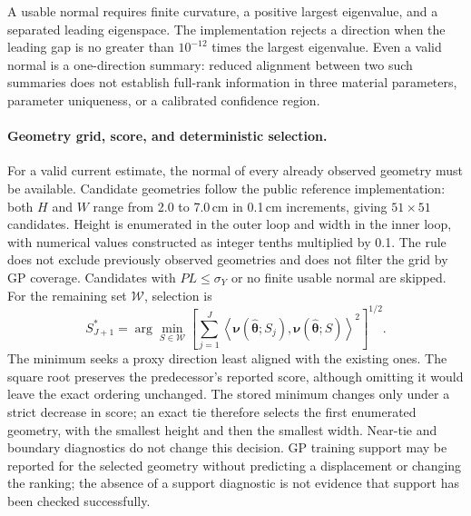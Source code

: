 A usable normal requires finite curvature, a positive largest
eigenvalue, and a separated leading eigenspace. The implementation
rejects a direction when the leading gap is no greater than
$10^{-12}$ times the largest eigenvalue. Even a valid normal is a
one-direction summary: reduced alignment between two such summaries
does not establish full-rank information in three material parameters,
parameter uniqueness, or a calibrated confidence region.

\paragraph{Geometry grid, score, and deterministic selection.}
For a valid current estimate, the normal of every already observed
geometry must be available. Candidate geometries follow the public
reference implementation: both $H$ and $W$ range from 2.0 to 7.0\,cm
in 0.1\,cm increments, giving $51\times51$ candidates. Height is
enumerated in the outer loop and width in the inner loop, with numerical
values constructed as integer tenths multiplied by 0.1. The rule does
not exclude previously observed geometries and does not filter the grid
by GP coverage. Candidates with $PL\leq\sigma_Y$ or no finite usable
normal are skipped. For the remaining set $\mathcal W$, selection is
\begin{equation}
\label{eq:proposer}
 S_{J+1}^*=\arg\min_{S\in\mathcal W}
 \left[\sum_{j=1}^{J}
   \left\langle
    \boldsymbol\nu(\widehat{\boldsymbol\theta};S_j),
    \boldsymbol\nu(\widehat{\boldsymbol\theta};S)
   \right\rangle^2\right]^{1/2}.
\end{equation}
The minimum seeks a proxy direction least aligned with the existing
ones. The square root preserves the predecessor's reported score,
although omitting it would leave the exact ordering unchanged.
The stored minimum changes only under a strict decrease in score;
an exact tie therefore selects the first enumerated geometry, with
the smallest height and then the smallest width. Near-tie and boundary
diagnostics do not change this decision. GP training support may be
reported for the selected geometry without predicting a displacement
or changing the ranking; the absence of a support diagnostic is not
evidence that support has been checked successfully.

